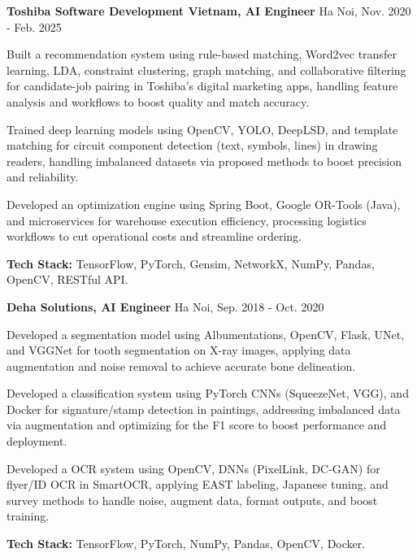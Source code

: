 \begin{cventries}
{\begin{cvitems}
      \end{cvitems}
    }
  \cvsimpleentry
    {\textbf{Toshiba Software Development Vietnam, AI Engineer}} %
    {Ha Noi, Nov. 2020 - Feb. 2025} %
    {
      \begin{cvitems} %
        \item {Built a recommendation system using rule-based matching, Word2vec transfer learning, LDA, constraint clustering, graph matching, and collaborative filtering for candidate-job pairing in Toshiba's digital marketing apps, handling feature analysis and workflows to boost quality and match accuracy.}
        \item {Trained deep learning models using OpenCV, YOLO, DeepLSD, and template matching for circuit component detection (text, symbols, lines) in drawing readers, handling imbalanced datasets via proposed methods to boost precision and reliability.}
        \item {Developed an optimization engine using Spring Boot, Google OR-Tools (Java), and microservices for warehouse execution efficiency, processing logistics workflows to cut operational costs and streamline ordering.}
        \item {\textbf{Tech Stack:} TensorFlow, PyTorch, Gensim, NetworkX, NumPy, Pandas, OpenCV, RESTful API.}
      \end{cvitems}
    }
  \cvsimpleentry
    {\textbf{Deha Solutions, AI Engineer}} %
    {Ha Noi, Sep. 2018 - Oct. 2020} %
    {
      \begin{cvitems} %
        \item {Developed a segmentation model using Albumentations, OpenCV, Flask, UNet, and VGGNet for tooth segmentation on X-ray images, applying data augmentation and noise removal to achieve accurate bone delineation.}
        \item {Developed a classification system using PyTorch CNNs (SqueezeNet, VGG), and Docker for signature/stamp detection in paintings, addressing imbalanced data via augmentation and optimizing for the F1 score to boost performance and deployment.}
        \item {Developed a OCR system using OpenCV, DNNs (PixelLink, DC-GAN) for flyer/ID OCR in SmartOCR, applying EAST labeling, Japanese tuning, and survey methods to handle noise, augment data, format outputs, and boost training.}
        \item {\textbf{Tech Stack:} TensorFlow, PyTorch, NumPy, Pandas, OpenCV, Docker.}
      \end{cvitems}
    }
\end{cventries}
